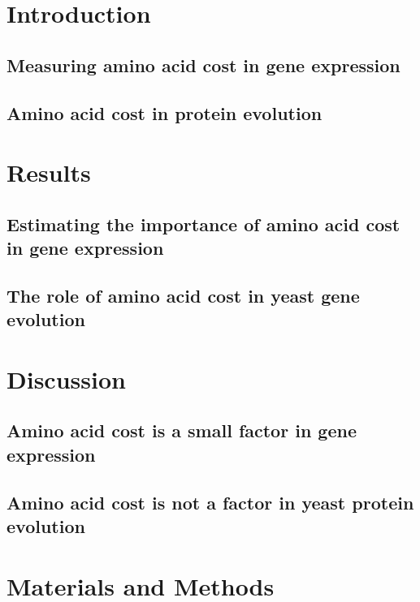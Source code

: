 \section{Introduction}

\subsection{Measuring amino acid cost in gene expression}

\subsection{Amino acid cost in protein evolution}

\section{Results}

\subsection{Estimating the importance of amino acid cost in gene expression}

\subsection{The role of amino acid cost in yeast gene evolution}

\section{Discussion}

\subsection{Amino acid cost is a small factor in gene expression}

\subsection{Amino acid cost is not a factor in yeast protein evolution}

\section{Materials and Methods}
